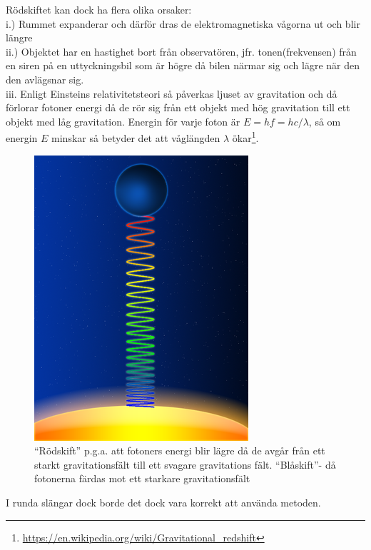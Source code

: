 \documentclass[./exercises.tex]{subfiles}
\begin{document}
Rödskiftet kan dock ha flera olika orsaker:\\ 
i.) Rummet expanderar och därför dras de elektromagnetiska vågorna ut och blir längre\\
ii.) Objektet har en hastighet bort från observatören, jfr. tonen(frekvensen) från en siren på en uttyckningsbil som är högre
då bilen närmar sig och lägre när den den avlägsnar sig.\\
iii. Enligt Einsteins relativitetsteori så påverkas ljuset av gravitation och då förlorar fotoner
energi då de rör sig från ett objekt med hög gravitation till ett objekt med låg gravitation.
Energin för varje foton är $E=h f=hc/\lambda$, så om energin $E$ minskar så betyder det att våglängden $\lambda$
ökar\footnote{\url{https://en.wikipedia.org/wiki/Gravitational_redshift}}.
\begin{figure}[H]
\begin{center}
  \includegraphics[scale=0.45]{Gravitational_red-shifting2.png}
  \caption{``Rödskift'' p.g.a. att fotoners energi blir lägre då de avgår från ett starkt gravitationsfält till ett svagare gravitations fält. ``Blåskift''- då fotonerna
färdas mot ett starkare gravitationsfält }
  \end{center}
  \label{fig4}
\end{figure}

I runda slängar dock borde det dock vara korrekt att använda metoden.
\end{document}
